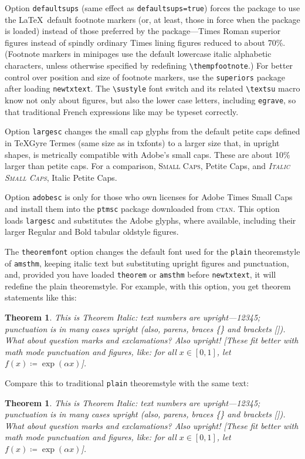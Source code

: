\documentclass[11pt]{article}
\theoremstyle{oldplain}
\newtheorem{oldthm}{Theorem}[section]
\theoremstyle{plain}
\newtheorem{thm}{Theorem}[section]
\begin{document}
Option {\tt defaultsups} (same effect as {\tt defaultsups=true}) forces the package to use the \LaTeX\ default footnote markers (or, at least, those in force when the package is loaded) instead of those preferred by the package---Times Roman superior figures instead of spindly ordinary Times lining figures reduced to about 70\%. (Footnote markers in minipages use the default lowercase italic alphabetic characters, unless otherwise specified by redefining \verb|\thempfootnote|.) For better control over position and size of footnote markers, use the {\tt superiors} package after loading {\tt newtxtext}. The \verb|\sustyle| font switch and its related \verb|\textsu| macro know not only about figures, but also the lower case letters, including \texttt{egrave}, so that traditional French expressions like  may be typeset correctly.

Option \texttt{largesc} changes the small cap glyphs from the default petite caps defined in TeXGyre Termes (same size as in txfonts) to a larger size that, in upright shapes, is metrically compatible with Adobe's small caps. These are about 10\% larger than petite caps. For a comparison, \textsc{Small Caps}, {Petite Caps}, and \textsc{\textit{Italic Small Caps}}, {Italic Petite Caps}.

Option \texttt{adobesc} is only for those who own licenses for \textsf{Adobe Times Small Caps} and install them into the \texttt{ptmsc} package downloaded from \textsc{ctan}. This option loads \texttt{largesc} and substitutes the Adobe glyphs, where available, including their larger Regular and Bold tabular oldstyle figures.

The {\tt theoremfont} option changes the default font used for the {\tt plain} theoremstyle of {\tt amsthm}, keeping italic text but substituting upright figures and punctuation, and, provided you have loaded {\tt theorem} or {\tt amsthm} before {\tt newtxtext}, it will redefine the plain theoremstyle.  For example, with this option, you get theorem statements like this:

\begin{thm}
This is Theorem Italic: text numbers are upright---12345; punctuation is in many cases upright (also, parens, braces \{\} and brackets []). What about question marks and exclamations? Also upright! [These fit better with math mode punctuation and figures, like: for all $x\in[0,1]$, let $f(x)\coloneq \exp(\alpha x)$].
\end{thm}
Compare this to traditional {\tt plain} theoremstyle with the same text:
\begin{oldthm}
This is Theorem Italic: text numbers are upright---12345; punctuation is in many cases upright (also, parens, braces \{\} and brackets []). What about question marks and exclamations? Also upright! [These fit better with math mode punctuation and figures, like: for all $x\in[0,1]$, let $f(x)\coloneq \exp(\alpha x)$].
\end{oldthm}
\end{document}
